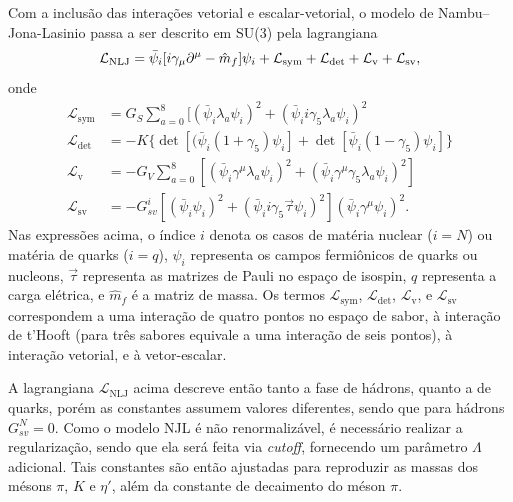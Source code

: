 Com a inclusão das interações vetorial e escalar-vetorial, o modelo de Nambu--Jona-Lasinio passa a ser descrito em SU(3) pela lagrangiana
\begin{equation}
	\mathcal{L}_{\rm{NLJ}} = \bar{\psi}_i[i\gamma_\mu\partial^\mu - \hat{m}_f]\psi_i + \mathcal{L}_{\textrm{sym}} + \mathcal{L}_{\textrm{det}} + \mathcal{L}_{\textrm{v}} + \mathcal{L}_{\textrm{sv}},
\end{equation}
%
onde
\begin{align}
	\mathcal{L}_{\textrm{sym}} &= G_S\sum_{a=0}^8[(\bar{\psi}_i\lambda_a\psi_i)^2 + (\bar{\psi}_i i\gamma_5\lambda_a\psi_i)^2 \\
	\mathcal{L}_{\textrm{det}} &= -K\{\det[(\bar{\psi}_i(1+\gamma_5)\psi_i] + \det[\bar{\psi}_i(1-\gamma_5)\psi_i]\} \\
	\mathcal{L}_{\textrm{v}} &= -G_V \sum_{a=0}^8[(\bar{\psi}_i\gamma^\mu\lambda_a\psi_i)^2 + (\bar{\psi}_i\gamma^\mu\gamma_5\lambda_a\psi_i)^2] \\
	\mathcal{L}_{\textrm{sv}} &= - G_{sv}^i \left[(\bar{\psi}_i\psi_i)^2 + (\bar{\psi}_i i \gamma_5 \vec{\tau}\psi_i)^2\right](\bar{\psi}_i\gamma^\mu\psi_i)^2.
\end{align}
%
Nas expressões acima, o índice $i$ denota os casos de matéria nuclear ($i = N$) ou matéria de quarks ($i = q$), $\psi_i$ representa os campos fermiônicos de quarks ou nucleons, $\vec{\tau}$ representa as matrizes de Pauli no espaço de isospin, $q$ representa a carga elétrica, e $\hat{m}_f$ é a matriz de massa. Os termos $\mathcal{L}_{\textrm{sym}}$, $\mathcal{L}_{\textrm{det}}$, $\mathcal{L}_{\textrm{v}}$, e $\mathcal{L}_{\textrm{sv}}$ correspondem a uma interação de quatro pontos no espaço de sabor, à interação de t'Hooft (para três sabores equivale a uma interação de seis pontos), à interação vetorial, e à vetor-escalar. 

A lagrangiana $\mathcal{L}_{\textrm{NLJ}}$ acima descreve então tanto a fase de hádrons, quanto a de quarks, porém as constantes assumem valores diferentes, sendo que para hádrons $G_{sv}^N = 0$. Como o modelo NJL é não renormalizável, é necessário realizar a regularização, sendo que ela será feita via \emph{cutoff}, fornecendo um parâmetro $\Lambda$ adicional. Tais constantes são então ajustadas para reproduzir as massas dos mésons $\pi$, $K$ e $\eta'$, além da constante de decaimento do méson $\pi$.

